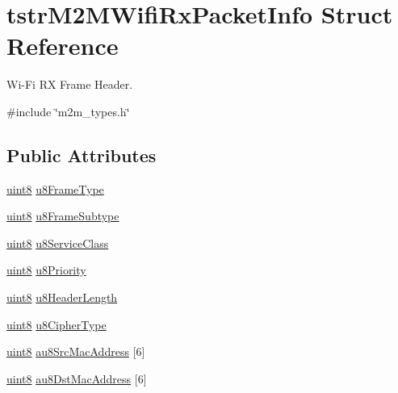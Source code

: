 \hypertarget{structtstrM2MWifiRxPacketInfo}{}\section{tstr\+M2\+M\+Wifi\+Rx\+Packet\+Info Struct Reference}
\label{structtstrM2MWifiRxPacketInfo}


Wi-\/\+Fi RX Frame Header.  




{\ttfamily \#include \char`\"{}m2m\+\_\+types.\+h\char`\"{}}

\subsection*{Public Attributes}
\begin{DoxyCompactItemize}
\item 
\hyperlink{group__DataT_ga4df709a77647e870bbf1d955b8edc9a6}{uint8} \hyperlink{structtstrM2MWifiRxPacketInfo_a15d2ea32b15af3afadecf6487bb0d086}{u8\+Frame\+Type}
\item 
\hyperlink{group__DataT_ga4df709a77647e870bbf1d955b8edc9a6}{uint8} \hyperlink{structtstrM2MWifiRxPacketInfo_a94a0de32be7e7aea41dd2ff83abc09aa}{u8\+Frame\+Subtype}
\item 
\hyperlink{group__DataT_ga4df709a77647e870bbf1d955b8edc9a6}{uint8} \hyperlink{structtstrM2MWifiRxPacketInfo_a651d0ffdcb888bfa5f481f9a80bd3477}{u8\+Service\+Class}
\item 
\hyperlink{group__DataT_ga4df709a77647e870bbf1d955b8edc9a6}{uint8} \hyperlink{structtstrM2MWifiRxPacketInfo_a608c6271f7b4159bdf61386e8b2edb13}{u8\+Priority}
\item 
\hyperlink{group__DataT_ga4df709a77647e870bbf1d955b8edc9a6}{uint8} \hyperlink{structtstrM2MWifiRxPacketInfo_a5ac7ba0e4a41dd15c167ba64b276ef79}{u8\+Header\+Length}
\item 
\hyperlink{group__DataT_ga4df709a77647e870bbf1d955b8edc9a6}{uint8} \hyperlink{structtstrM2MWifiRxPacketInfo_a0bfec55ad01cfa48eaa826dba9590143}{u8\+Cipher\+Type}
\item 
\hyperlink{group__DataT_ga4df709a77647e870bbf1d955b8edc9a6}{uint8} \hyperlink{structtstrM2MWifiRxPacketInfo_a1959a05349bd0c21a86870d0078911b3}{au8\+Src\+Mac\+Address} \mbox{[}6\mbox{]}
\item 
\hyperlink{group__DataT_ga4df709a77647e870bbf1d955b8edc9a6}{uint8} \hyperlink{structtstrM2MWifiRxPacketInfo_a1ff13b2f28466795da06553e962c5226}{au8\+Dst\+Mac\+Address} \mbox{[}6\mbox{]}

\end{DoxyCompactItemize}

